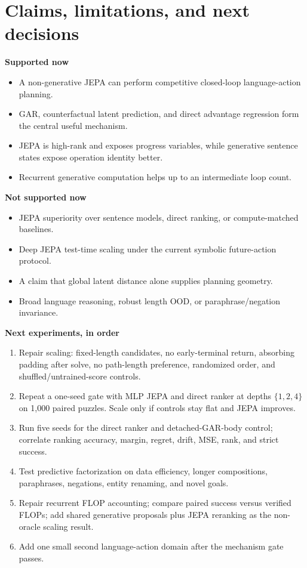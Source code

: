 \documentclass[10pt]{article}
\begin{document}
\section{Claims, limitations, and next decisions}
\textbf{Supported now}
\begin{itemize}
\item A non-generative JEPA can perform competitive closed-loop language-action planning.
\item GAR, counterfactual latent prediction, and direct advantage regression form the central useful mechanism.
\item JEPA is high-rank and exposes progress variables, while generative sentence states expose operation identity better.
\item Recurrent generative computation helps up to an intermediate loop count.
\end{itemize}
\textbf{Not supported now}
\begin{itemize}
\item JEPA superiority over sentence models, direct ranking, or compute-matched baselines.
\item Deep JEPA test-time scaling under the current symbolic future-action protocol.
\item A claim that global latent distance alone supplies planning geometry.
\item Broad language reasoning, robust length OOD, or paraphrase/negation invariance.
\end{itemize}
\textbf{Next experiments, in order}
\begin{enumerate}
\item Repair scaling: fixed-length candidates, no early-terminal return, absorbing padding after solve, no path-length preference, randomized order, and shuffled/untrained-score controls.
\item Repeat a one-seed gate with MLP JEPA and direct ranker at depths $\{1,2,4\}$ on 1,000 paired puzzles. Scale only if controls stay flat and JEPA improves.
\item Run five seeds for the direct ranker and detached-GAR-body control; correlate ranking accuracy, margin, regret, drift, MSE, rank, and strict success.
\item Test predictive factorization on data efficiency, longer compositions, paraphrases, negations, entity renaming, and novel goals.
\item Repair recurrent FLOP accounting; compare paired success versus verified FLOPs; add shared generative proposals plus JEPA reranking as the non-oracle scaling result.
\item Add one small second language-action domain after the mechanism gate passes.
\end{enumerate}
\end{document}
